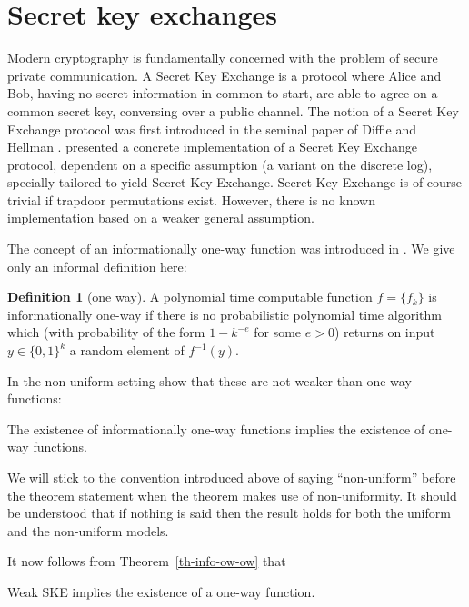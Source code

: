 \documentclass[manuscript, printscheme]{aomart}
\newtheorem[{}\it]{thm}{Theorem}[section]
\theoremstyle{definition}
\newtheorem{defn}{Definition}[section]
\newtheorem*[{}\it]{notation}{Notation}
\newcommand{\thmref}[1]{Theorem~\ref{#1}}
\begin{document}
\section{Secret key exchanges}
\label{SKE}

Modern cryptography is fundamentally concerned with the problem of
secure private communication.  A Secret Key Exchange is a protocol
where Alice and Bob, having no secret information in common to start,
are able to agree on a common secret key, conversing over a public
channel.  The notion of a Secret Key Exchange protocol was first
introduced in the seminal paper of Diffie and Hellman
\cite{dihe:newdir}. \cite{dihe:newdir} presented a concrete
implementation of a Secret Key Exchange protocol, dependent on a
specific assumption (a variant on the discrete log), specially
tailored to yield Secret Key Exchange. Secret Key Exchange is of
course trivial if trapdoor permutations exist. However, there is no
known implementation based on a weaker general assumption.

The concept of an informationally one-way function was introduced
in \cite{imlelu:oneway}. We give only an informal definition here:

\begin{defn}[one way] A polynomial time
computable function $f = \{f_k\}$ is informationally
one-way if there is no probabilistic polynomial time algorithm which
(with probability of the form $1 - k^{-e}$ for some $e > 0$)
returns on input $y \in \{0,1\}^{k}$ a random element of $f^{-1}(y)$.
\end{defn}
In the non-uniform setting \cite{imlelu:oneway} show that these are not
weaker than one-way functions:
\begin{thm}
\label{th-info-ow-ow}
The existence of informationally one-way functions
implies the existence of one-way functions.
\end{thm}
We will stick to the convention introduced above of saying
``non-uniform'' before the theorem statement when the theorem
makes use of non-uniformity. It should be understood that
if nothing is said then the result holds for both the uniform and
the non-uniform models.

It now follows from \thmref{th-info-ow-ow} that

\begin{thm}\label{th-weak-ske-owf} Weak SKE
implies the existence of a one-way function.
\end{thm}
\end{document}

